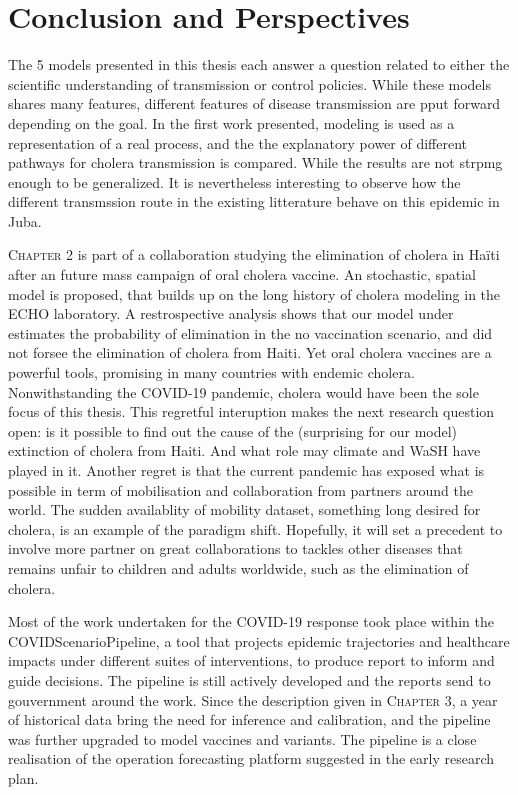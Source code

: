 \chapter*{Conclusion and Perspectives}
The 5 models presented in this thesis each answer a question related to either the scientific understanding of transmission or control policies. While these models shares many features, different features of disease transmission are pput forward depending on the goal. 
In the first work presented, modeling is used as a representation of a real process, and the the explanatory power of different pathways for cholera transmission is compared. While the results are not strpmg enough to be generalized. It is nevertheless interesting to observe how the different transmssion route in the existing litterature behave on this epidemic in Juba.

\textsc{Chapter 2} is part of a collaboration studying the elimination of cholera in Haïti after an future mass campaign of oral cholera vaccine. An stochastic, spatial model is proposed, that builds up on the long history of cholera modeling in the ECHO laboratory. A restrospective analysis shows that our model under estimates the probability of elimination in the no vaccination scenario, and did not forsee the elimination of cholera from Haiti. Yet oral cholera vaccines are a powerful tools, promising in many countries with endemic cholera. 
Nonwithstanding the COVID-19 pandemic, cholera would have been the sole focus of this thesis. This regretful interuption makes the next research question open: is it possible to find out the cause of the (surprising for our model) extinction of cholera from Haiti. And what role may climate and WaSH have played in it. Another regret is that the current pandemic has exposed what is possible in term of mobilisation and collaboration from partners around the world. The sudden availablity of mobility dataset, something long desired for cholera, is an example of the paradigm shift. Hopefully, it will set a precedent to involve more partner on great collaborations to tackles other diseases that remains unfair to children and adults worldwide, such as the elimination of cholera.

Most of the work undertaken for the COVID-19 response took place within the COVIDScenarioPipeline, a tool that projects epidemic trajectories and healthcare impacts under different suites of interventions, to produce report to inform and guide decisions. The pipeline is still actively developed and the reports send to gouvernment around the work. Since the description given in \textsc{Chapter 3}, a year of historical data bring the need for inference and calibration, and the pipeline was further upgraded to model vaccines and variants. The pipeline is a close realisation of the operation forecasting platform suggested in the early research plan.

